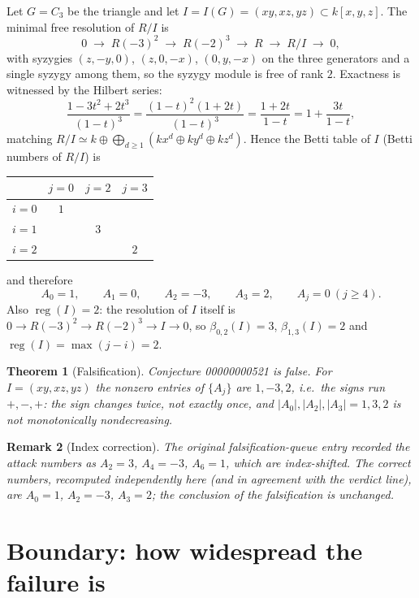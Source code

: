 \documentclass[11pt]{article}
\newtheorem{theorem}{Theorem}
\newtheorem{remark}[theorem]{Remark}
\begin{document}
Let $G=C_3$ be the triangle and let $I=I(G)=(xy,xz,yz)\subset k[x,y,z]$.
The minimal free resolution of $R/I$ is
\[
0\;\longrightarrow\; R(-3)^2
\;\longrightarrow\; R(-2)^3
\;\longrightarrow\; R
\;\longrightarrow\; R/I \;\longrightarrow\; 0,
\]
with syzygies $(z,-y,0)$, $(z,0,-x)$, $(0,y,-x)$ on the three generators and
a single syzygy among them, so the syzygy module is free of rank $2$.
Exactness is witnessed by the Hilbert series:
\[
\frac{1-3t^2+2t^3}{(1-t)^3}=\frac{(1-t)^2(1+2t)}{(1-t)^3}
=\frac{1+2t}{1-t}=1+\frac{3t}{1-t},
\]
matching $R/I\simeq k\oplus\bigoplus_{d\ge1}(kx^d\oplus ky^d\oplus kz^d)$.
Hence the Betti table of $I$ (Betti numbers of $R/I$) is
\begin{center}
\begin{tabular}{c|ccc}
 & $j=0$ & $j=2$ & $j=3$ \\ \toprule
$i=0$ & $1$ & & \\
$i=1$ & & $3$ & \\
$i=2$ & & & $2$ \\ \bottomrule
\end{tabular}
\end{center}
and therefore
\[
A_0=1,\qquad A_1=0,\qquad A_2=-3,\qquad A_3=2,\qquad A_j=0\ (j\ge4).
\]
Also $\operatorname{reg}(I)=2$: the resolution of $I$ itself is
$0\to R(-3)^2\to R(-2)^3\to I\to 0$, so $\beta_{0,2}(I)=3$,
$\beta_{1,3}(I)=2$ and $\operatorname{reg}(I)=\max(j-i)=2$.

\begin{theorem}[Falsification]
\label{thm:main}
Conjecture 00000000521 is false. For $I=(xy,xz,yz)$ the nonzero entries of
$\{A_j\}$ are $1,-3,2$, i.e.\ the signs run $+,-,+$: the sign changes
\emph{twice}, not exactly once, and $|A_0|,|A_2|,|A_3|=1,3,2$ is not
monotonically nondecreasing.
\end{theorem}

\begin{remark}[Index correction]
The original falsification-queue entry recorded the attack numbers as
$A_2=3$, $A_4=-3$, $A_6=1$, which are index-shifted. The correct numbers,
recomputed independently here (and in agreement with the verdict line), are
$A_0=1$, $A_2=-3$, $A_3=2$; the conclusion of the falsification is unchanged.
\end{remark}

\section{Boundary: how widespread the failure is}
\end{document}

